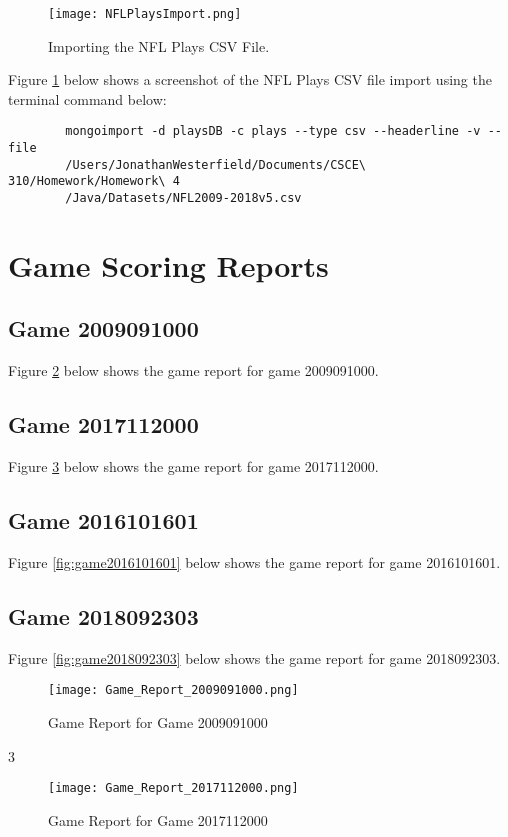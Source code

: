 \documentclass [a4paper,12pt] {article}
\begin{document}
    \begin{figure}
        \texttt{[image: NFLPlaysImport.png]}
        \caption{Importing the NFL Plays CSV File.}
        \label{fig:import1}
    \end{figure} 

    Figure \ref{fig:import1} below shows a screenshot of the NFL Plays CSV file import
    using the terminal command below:

    \begin{verbatim}
        mongoimport -d playsDB -c plays --type csv --headerline -v --file 
        /Users/JonathanWesterfield/Documents/CSCE\ 310/Homework/Homework\ 4
        /Java/Datasets/NFL2009-2018v5.csv
    \end{verbatim}

\section{Game Scoring Reports}
    \subsection{Game 2009091000}
        Figure \ref{fig:game2009091000} below shows the game report for game 2009091000.

    \subsection{Game 2017112000}
        Figure \ref{fig:game2017112000} below shows the game report for game 2017112000.

    \subsection{Game 2016101601}
        Figure \ref{fig:game2016101601} below shows the game report for game 2016101601.
    
    \subsection{Game 2018092303}
        Figure \ref{fig:game2018092303} below shows the game report for game 2018092303.

    \begin{figure}
        \texttt{[image: Game\_Report\_2009091000.png]}
        \caption{Game Report for Game 2009091000}
        \label{fig:game2009091000}
    \end{figure} 
3
    \begin{figure}
        \texttt{[image: Game\_Report\_2017112000.png]}
        \caption{Game Report for Game 2017112000}
        \label{fig:game2017112000}
    \end{figure} 
\end{document}
